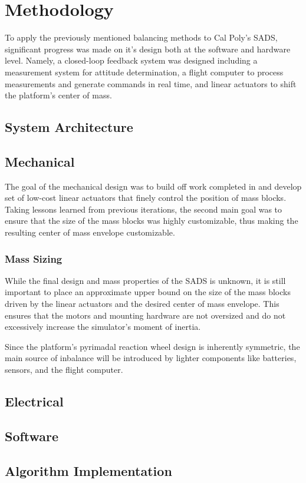 \chapter{Methodology}

To apply the previously mentioned balancing methods to Cal Poly's SADS, significant progress was made on it's design both at the software and hardware level. Namely, a closed-loop feedback system was designed including a measurement system for attitude determination, a flight computer to process measurements and generate commands in real time, and linear actuators to shift the platform's center of mass.

\section{System Architecture}

\section{Mechanical}

The goal of the mechanical design was to build off work completed in \cite{gilman_automatic_2024} and develop set of low-cost linear actuators that finely control the position of mass blocks. Taking lessons learned from previous iterations, the second main goal was to ensure that the size of the mass blocks was highly customizable, thus making the resulting center of mass envelope customizable. 

\subsection{Mass Sizing}

While the final design and mass properties of the SADS is unknown, it is still important to place an approximate upper bound on the size of the mass blocks driven by the linear actuators and the desired center of mass envelope. This ensures that the motors and mounting hardware are not oversized and do not excessively increase the simulator's moment of inertia.

Since the platform's pyrimadal reaction wheel design is inherently symmetric, the main source of inbalance will be introduced by lighter components like batteries, sensors, and the flight computer. 




\section{Electrical}

\section{Software}

\section{Algorithm Implementation}